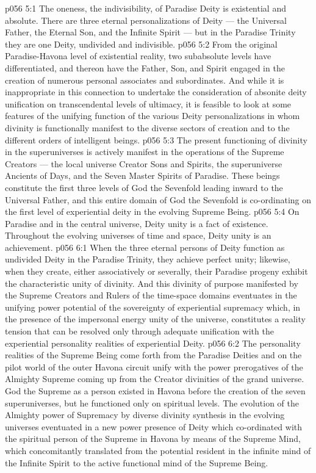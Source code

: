 \vs p056 5:1 The oneness, the indivisibility, of Paradise Deity is existential and absolute. There are three eternal personalizations of Deity --- the Universal Father, the Eternal Son, and the Infinite Spirit --- but in the Paradise Trinity they are  one Deity, undivided and indivisible.
\vs p056 5:2 \pc From the original Paradise\hyp{}Havona level of existential reality, two subabsolute levels have differentiated, and thereon have the Father, Son, and Spirit engaged in the creation of numerous personal associates and subordinates. And while it is inappropriate in this connection to undertake the consideration of absonite deity unification on transcendental levels of ultimacy, it is feasible to look at some features of the unifying function of the various Deity personalizations in whom divinity is functionally manifest to the diverse sectors of creation and to the different orders of intelligent beings.
\vs p056 5:3 The present functioning of divinity in the superuniverses is actively manifest in the operations of the Supreme Creators --- the local universe Creator Sons and Spirits, the superuniverse Ancients of Days, and the Seven Master Spirits of Paradise. These beings constitute the first three levels of God the Sevenfold leading inward to the Universal Father, and this entire domain of God the Sevenfold is co\hyp{}ordinating on the first level of experiential deity in the evolving Supreme Being.
\vs p056 5:4 \pc On Paradise and in the central universe, Deity unity is a fact of existence. Throughout the evolving universes of time and space, Deity unity is an achievement.
\vs p056 6:1 When the three eternal persons of Deity function as undivided Deity in the Paradise Trinity, they achieve perfect unity; likewise, when they create, either associatively or severally, their Paradise progeny exhibit the characteristic unity of divinity. And this divinity of purpose manifested by the Supreme Creators and Rulers of the time\hyp{}space domains eventuates in the unifying power potential of the sovereignty of experiential supremacy which, in the presence of the impersonal energy unity of the universe, constitutes a reality tension that can be resolved only through adequate unification with the experiential personality realities of experiential Deity.
\vs p056 6:2 The personality realities of the Supreme Being come forth from the Paradise Deities and on the pilot world of the outer Havona circuit unify with the power prerogatives of the Almighty Supreme coming up from the Creator divinities of the grand universe. God the Supreme as a person existed in Havona before the creation of the seven superuniverses, but he functioned only on spiritual levels. The evolution of the Almighty power of Supremacy by diverse divinity synthesis in the evolving universes eventuated in a new power presence of Deity which co\hyp{}ordinated with the spiritual person of the Supreme in Havona by means of the Supreme Mind, which concomitantly translated from the potential resident in the infinite mind of the Infinite Spirit to the active functional mind of the Supreme Being.
